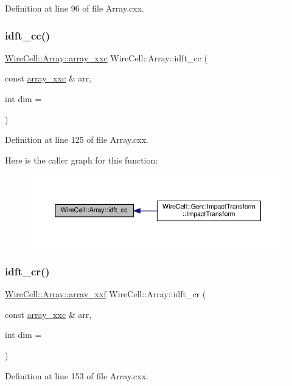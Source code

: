 Definition at line 96 of file Array.\+cxx.

\mbox{\label{namespace_wire_cell_1_1_array_a9d111d786752105dff7dff62704ca7d2}} 
\subsubsection{\texorpdfstring{idft\+\_\+cc()}{idft\_cc()}}
{\footnotesize\ttfamily \hyperlink{namespace_wire_cell_1_1_array_a4688507545975422d74b9ba78530956a}{Wire\+Cell\+::\+Array\+::array\+\_\+xxc} Wire\+Cell\+::\+Array\+::idft\+\_\+cc (\begin{DoxyParamCaption}\item[{const \hyperlink{namespace_wire_cell_1_1_array_a4688507545975422d74b9ba78530956a}{array\+\_\+xxc} \&}]{arr,  }\item[{int}]{dim = {} }\end{DoxyParamCaption})}



Definition at line 125 of file Array.\+cxx.

Here is the caller graph for this function\+:
\nopagebreak
\begin{figure}[H]
\begin{center}
\leavevmode
\includegraphics[width=350pt]{namespace_wire_cell_1_1_array_a9d111d786752105dff7dff62704ca7d2_icgraph}
\end{center}
\end{figure}
\mbox{\label{namespace_wire_cell_1_1_array_aff0d07e015ea44d76736b57baa5d3693}} 
\subsubsection{\texorpdfstring{idft\+\_\+cr()}{idft\_cr()}}
{\footnotesize\ttfamily \hyperlink{namespace_wire_cell_1_1_array_ab565fef5e33632bb02f0ed4be803020c}{Wire\+Cell\+::\+Array\+::array\+\_\+xxf} Wire\+Cell\+::\+Array\+::idft\+\_\+cr (\begin{DoxyParamCaption}\item[{const \hyperlink{namespace_wire_cell_1_1_array_a4688507545975422d74b9ba78530956a}{array\+\_\+xxc} \&}]{arr,  }\item[{int}]{dim = {} }\end{DoxyParamCaption})}



Definition at line 153 of file Array.\+cxx.

